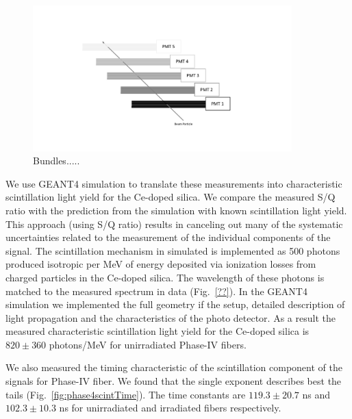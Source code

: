 \documentclass[a4paper,11pt]{article}
\begin{document}
\begin{figure}[ht]
\begin{center}\vspace{-1pc}
      \includegraphics[width=10cm]{Figures/FiberBundles.pdf}
\caption{\small Bundles.....}
    \label{fig:bundles}
\end{center}
\end{figure}

We use GEANT4 simulation to translate these measurements into characteristic scintillation light yield for the Ce-doped silica. We compare the measured S/Q ratio with the prediction from the simulation with known scintillation light yield. This approach (using S/Q ratio) results in canceling out many of the systematic uncertainties related to the measurement of the individual components of the signal. The scintillation mechanism in simulated is implemented as 500 photons produced isotropic per MeV of energy deposited via ionization losses from charged particles in the Ce-doped silica. The wavelength of these photons is  matched to the measured spectrum in data (Fig.~\ref{??}). In the GEANT4 simulation we implemented the full geometry if the setup, detailed description of light propagation and the characteristics of the photo detector. 
As a result the measured characteristic scintillation light yield for the Ce-doped silica is $820\pm 360$ photons/MeV for unirradiated Phase-IV fibers. 

We also measured the timing characteristic of the scintillation component of the signals for Phase-IV fiber. We found that the single exponent describes best the tails (Fig.~\ref{fig:phase4scintTime}). The time constants are $119.3 \pm 20.7$ ns and $102.3 \pm 10.3$ ns for unirradiated and irradiated fibers respectively.
\end{document}
